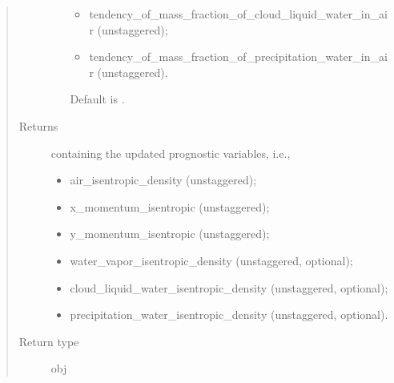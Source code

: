 \documentclass[letterpaper,10pt,english]{sphinxmanual}
\begin{document}
\begin{fulllineitems}
\begin{fulllineitems}
\begin{quote}
\begin{description}
\begin{itemize}
\begin{itemize}
\item {} 
tendency\_of\_mass\_fraction\_of\_cloud\_liquid\_water\_in\_air (unstaggered);

\item {} 
tendency\_of\_mass\_fraction\_of\_precipitation\_water\_in\_air (unstaggered).

\end{itemize}

Default is .


\end{itemize}

\item[{Returns}] \leavevmode

{\hyperref[\detokenize{api:storages.state_isentropic.StateIsentropic}]{}} containing the updated prognostic variables, i.e.,
\begin{itemize}
\item {} 
air\_isentropic\_density (unstaggered);

\item {} 
x\_momentum\_isentropic (unstaggered);

\item {} 
y\_momentum\_isentropic (unstaggered);

\item {} 
water\_vapor\_isentropic\_density (unstaggered, optional);

\item {} 
cloud\_liquid\_water\_isentropic\_density (unstaggered, optional);

\item {} 
precipitation\_water\_isentropic\_density (unstaggered, optional).

\end{itemize}


\item[{Return type}] \leavevmode
obj

\end{description}\end{quote}

\end{fulllineitems}


\end{fulllineitems}

\end{document}
